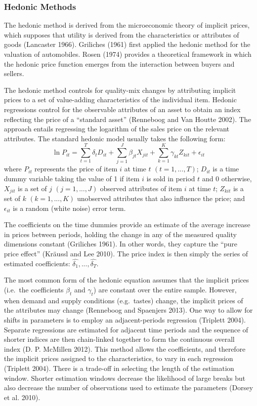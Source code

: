 \documentclass[]{elsarticle} %
\begin{document}
\subsubsection{Hedonic Methods}\label{hedonic-methods}

The hedonic method is derived from the microeconomic theory of implicit
prices, which supposes that utility is derived from the characteristics
or attributes of goods (Lancaster 1966). Griliches (1961) first applied
the hedonic method for the valuation of automobiles. Rosen (1974)
provides a theoretical framework in which the hedonic price function
emerges from the interaction between buyers and sellers.

The hedonic method controls for quality-mix changes by attributing
implicit prices to a set of value-adding characteristics of the
individual item. Hedonic regressions control for the observable
attributes of an asset to obtain an index reflecting the price of a
``standard asset'' (Renneboog and Van Houtte 2002). The approach entails
regressing the logarithm of the sales price on the relevant attributes.
The standard hedonic model usually takes the following form:
\[\ln P_{it} = \sum_{t=1}^T \delta_t D_{it} + \sum_{j=1}^J \beta_{jt} X_{jit} + \sum_{k=1}^K \gamma_{kt} Z_{kit} + \epsilon_{it}\]
where \(P_{it}\) represents the price of item \(i\) at time \(t\)
\((t=1, ..., T)\); \(D_{it}\) is a time dummy variable taking the value
of 1 if item \(i\) is sold in period \(t\) and 0 otherwise, \(X_{jit}\)
is a set of \(j\) \((j=1, ..., J)\) observed attributes of item \(i\) at
time \(t\); \(Z_{kit}\) is a set of \(k\) \((k=1, ..., K)\) unobserved
attributes that also influence the price; and \(\epsilon_{it}\) is a
random (white noise) error term.

The coefficients on the time dummies provide an estimate of the average
increase in prices between periods, holding the change in any of the
measured quality dimensions constant (Griliches 1961). In other words,
they capture the ``pure price effect'' (Kräussl and Lee 2010). The price
index is then simply the series of estimated coefficients:
\(\hat{\delta_1}, ..., \hat{\delta_T}\).

The most common form of the hedonic equation assumes that the implicit
prices (i.e.~the coefficients \(\beta_t\) and \(\gamma_t\)) are constant
over the entire sample. However, when demand and supply conditions
(e.g.~tastes) change, the implicit prices of the attributes may change
(Renneboog and Spaenjers 2013). One way to allow for shifts in
parameters is to employ an adjacent-periods regression (Triplett 2004).
Separate regressions are estimated for adjacent time periods and the
sequence of shorter indices are then chain-linked together to form the
continuous overall index (D. P. McMillen 2012). This method allows the
coefficients, and therefore the implicit prices assigned to the
characteristics, to vary in each regression (Triplett 2004). There is a
trade-off in selecting the length of the estimation window. Shorter
estimation windows decrease the likelihood of large breaks but also
decrease the number of observations used to estimate the parameters
(Dorsey et al. 2010).
\end{document}
